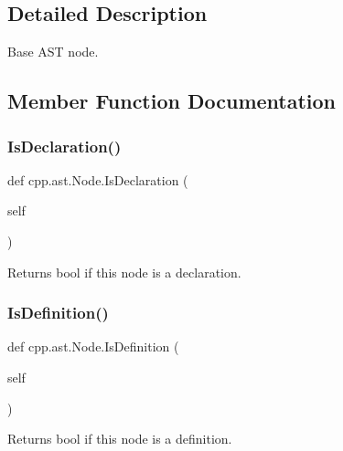 \subsection{Detailed Description}
\begin{DoxyVerb}Base AST node.\end{DoxyVerb}
 

\subsection{Member Function Documentation}
\mbox{\label{classcpp_1_1ast_1_1Node_ab3eca703a79fb65bc25dfbcb7547c79e}} 
\subsubsection{\texorpdfstring{Is\+Declaration()}{IsDeclaration()}}
{\footnotesize\ttfamily def cpp.\+ast.\+Node.\+Is\+Declaration (\begin{DoxyParamCaption}\item[{}]{self }\end{DoxyParamCaption})}

\begin{DoxyVerb}Returns bool if this node is a declaration.\end{DoxyVerb}
 \mbox{\label{classcpp_1_1ast_1_1Node_a684ee9a357168e7e07a24fc6812f66e6}} 
\subsubsection{\texorpdfstring{Is\+Definition()}{IsDefinition()}}
{\footnotesize\ttfamily def cpp.\+ast.\+Node.\+Is\+Definition (\begin{DoxyParamCaption}\item[{}]{self }\end{DoxyParamCaption})}

\begin{DoxyVerb}Returns bool if this node is a definition.\end{DoxyVerb}
 \mbox{\label{classcpp_1_1ast_1_1Node_a313273874ccf578485006d4000128234}} 
